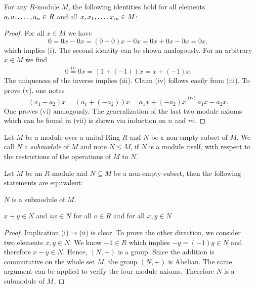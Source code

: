\begin{lem}\label{lm.basicProp}For any $R$-module $M$, the following identities hold for all elements $a,\seq{a}\in R$ and all $x,\seq[m]{x}\in M$:
\begin{multienumerate}
\end{multienumerate} 
\end{lem}
\begin{proof}
For all $x\in M$ we have
\begin{equation*}
0=0x-0x=(0+0)x-0x=0x+0x-0x=0x,
\end{equation*}
which implies (i). The second identity can be shown analogously. For an arbitrary $x\in M$ we find 
\begin{equation*}
0\overset{\text{(i)}}{=}0x=(1+(-1))x=x+(-1)x.
\end{equation*}
The uniqueness of the inverse implies (iii). Claim (iv) follows easily from (iii). To prove (v), one notes
\begin{equation*} 
(a_1-a_2)x=(a_1+(-a_2))x=a_1x+(-a_2)x\overset{\text{(iv)}}{=}a_1x-a_2x.
\end{equation*}
One proves (vi) analogously. The generalization of the last two module axioms which can be found in (vii) is shown via induction on $n$ and $m$.
\end{proof}

\begin{defin}Let $M$ be a module over a unital Ring $R$ and $N$ be a non-empty subset of $M$. We call $N$ a \emph{submodule} of $M$ and note $N\leq M$, if $N$ is a module itself, with respect to the restrictions of the operations of $M$ to $N$.
\end{defin}  

\begin{lem}\label{lm.SubMod}
Let $M$ be an $R$-module and $N\subseteq M$ be a non-empty subset, then the following statements are equivalent:
\begin{thmlist}
\item $N$ is a submodule of $M$.
\item $x+y\in N$ and $ax\in N$ for all $a\in R$ and for all $x,y\in N$
\end{thmlist}
\end{lem}
\begin{proof}
Implication (i)$\Rightarrow$(ii) is clear. To prove the other direction, we consider two elements $x,y\in N$. We know $-1\in R$ which implies $-y=(-1)y\in N$ and therefore $x-y\in N$. Hence, $(N,+)$ is a group. Since the addition is commutative on the whole set $M$, the group $(N,+)$ is Abelian. The same argument can be applied to verify the four module axioms. Therefore $N$ is a submodule of $M$. 
\end{proof}

